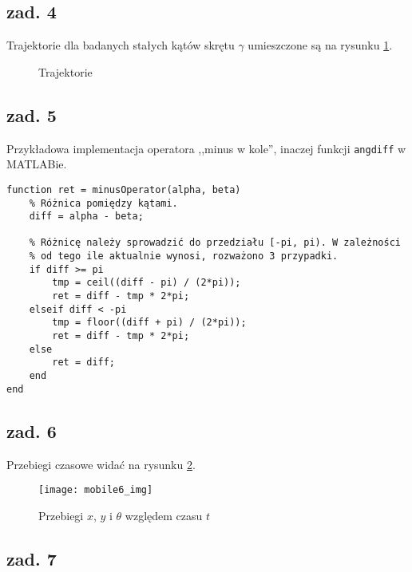 \documentclass[11pt, a4paper]{article}
\begin{document}
\subsection*{zad. 4}

Trajektorie dla badanych stałych kątów skrętu $\gamma$ umieszczone są na rysunku \ref{fig:mobile3t}.
\begin{figure}[htbp!]
	\centering
	
	\hfill%
	\hfill%
	
	\caption{Trajektorie \label{fig:mobile3t}}
\end{figure}

\subsection*{zad. 5}

Przykładowa implementacja operatora ,,minus w kole'', inaczej funkcji \texttt{angdiff} w MATLABie.
\begin{lstlisting}
function ret = minusOperator(alpha, beta)
    % Różnica pomiędzy kątami.
    diff = alpha - beta;
    
    % Różnicę należy sprowadzić do przedziału [-pi, pi). W zależności
    % od tego ile aktualnie wynosi, rozważono 3 przypadki.
    if diff >= pi
        tmp = ceil((diff - pi) / (2*pi));
        ret = diff - tmp * 2*pi;
    elseif diff < -pi
        tmp = floor((diff + pi) / (2*pi));
        ret = diff - tmp * 2*pi;
    else
        ret = diff;
    end
end
\end{lstlisting}

\subsection*{zad. 6}

Przebiegi czasowe widać na rysunku \ref{fig:mobile6img}.
\begin{figure}[htbp!]
	\centering
	\texttt{[image: mobile6\_img]}
	\caption{Przebiegi $x$, $y$ i $\theta$ względem czasu $t$ \label{fig:mobile6img}}
\end{figure}

\subsection*{zad. 7}
\end{document}

